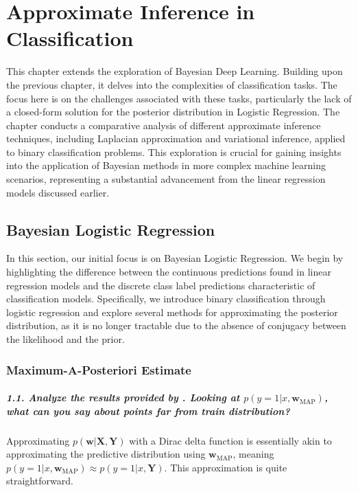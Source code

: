 \graphicspath{{figs/3b}}

\chapter{Approximate Inference in Classification}

This chapter extends the exploration of Bayesian Deep Learning. Building upon the previous chapter, it delves into the complexities of classification tasks. The focus here is on the challenges associated with these tasks, particularly the lack of a closed-form solution for the posterior distribution in Logistic Regression. The chapter conducts a comparative analysis of different approximate inference techniques, including Laplacian approximation and variational inference, applied to binary classification problems. This exploration is crucial for gaining insights into the application of Bayesian methods in more complex machine learning scenarios, representing a substantial advancement from the linear regression models discussed earlier.

\section{Bayesian Logistic Regression}

In this section, our initial focus is on Bayesian Logistic Regression. We begin by highlighting the difference between the continuous predictions found in linear regression models and the discrete class label predictions characteristic of classification models. Specifically, we introduce binary classification through logistic regression and explore several methods for approximating the posterior distribution, as it is no longer tractable due to the absence of conjugacy between the likelihood and the prior. 

\subsection{Maximum-A-Posteriori Estimate}
\paragraph{1.1. Analyze the results provided by . Looking at $p(y=1 | x, \mathbf{w}_{\textrm{MAP}})$, what can you say about points far from train distribution?}

Approximating $p(\mathbf{w} | \mathbf{X}, \mathbf{Y})$ with a Dirac delta function is essentially akin to approximating the predictive distribution using $\mathbf{w}_{\textrm{MAP}}$, meaning $p(y=1 | x, \mathbf{w}_{\textrm{MAP}}) \approx p(y=1 | x, \mathbf{Y})$. This approximation is quite straightforward. 

